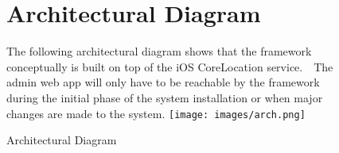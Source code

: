 \begin{figure}
\chapter{Architectural Diagram}
The following architectural diagram shows that the framework conceptually is built on top of the iOS CoreLocation service.  The admin web app will only have to be reachable by the framework during the initial phase of the system installation or when major changes are made to the system.
\newline
\texttt{[image: images/arch.png]}
\caption{Architectural Diagram}
\end{figure}
